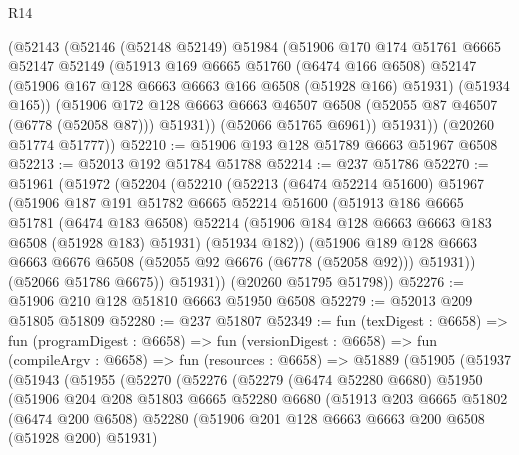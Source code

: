 \begin{lexlean}{R14}
\begin{coremodule}
        (@52143
          (@52146
            (@52148 @52149)
            @51984
            (@51906
              @170
              @174
              @51761
              @6665
              @52147
              @52149
              (@51913
                @169
                @6665
                @51760
                (@6474 @166 @6508)
                @52147
                (@51906 @167 @128 @6663 @6663 @166 @6508 (@51928 @166) @51931)
                (@51934 @165))
              (@51906
                @172
                @128
                @6663
                @6663
                @46507
                @6508
                (@52055 @87 @46507 (@6778 (@52058 @87)))
                @51931))
            (@52066 @51765 @6961))
          @51931))
      (@20260 @51774 @51777))
@52210 := @51906 @193 @128 @51789 @6663 @51967 @6508
@52213 := @52013 @192 @51784 @51788
@52214 := @237 @51786
@52270 := @51961
    (@51972
      (@52204
        (@52210
          (@52213
            (@6474 @52214 @51600)
            @51967
            (@51906
              @187
              @191
              @51782
              @6665
              @52214
              @51600
              (@51913
                @186
                @6665
                @51781
                (@6474 @183 @6508)
                @52214
                (@51906 @184 @128 @6663 @6663 @183 @6508 (@51928 @183) @51931)
                (@51934 @182))
              (@51906
                @189
                @128
                @6663
                @6663
                @6676
                @6508
                (@52055 @92 @6676 (@6778 (@52058 @92)))
                @51931))
            (@52066 @51786 @6675))
          @51931))
      (@20260 @51795 @51798))
@52276 := @51906 @210 @128 @51810 @6663 @51950 @6508
@52279 := @52013 @209 @51805 @51809
@52280 := @237 @51807
@52349 := fun (texDigest : @6658) =>
  fun (programDigest : @6658) =>
  fun (versionDigest : @6658) =>
  fun (compileArgv : @6658) =>
  fun (resources : @6658) =>
  @51889
    (@51905
      (@51937
        (@51943
          (@51955
            (@52270
              (@52276
                (@52279
                  (@6474 @52280 @6680)
                  @51950
                  (@51906
                    @204
                    @208
                    @51803
                    @6665
                    @52280
                    @6680
                    (@51913
                      @203
                      @6665
                      @51802
                      (@6474 @200 @6508)
                      @52280
                      (@51906 @201 @128 @6663 @6663 @200 @6508 (@51928 @200) @51931)

\end{coremodule}
\end{lexlean}
